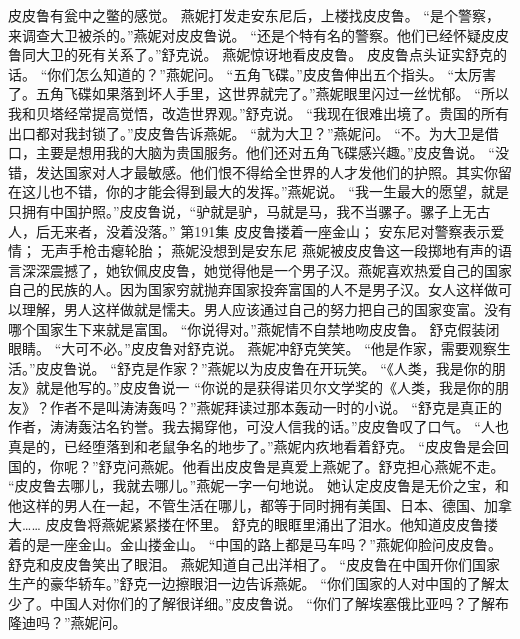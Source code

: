 \documentclass[a4paper,12pt,UTF8,twoside]{ctexbook}
\begin{document}
        皮皮鲁有瓮中之鳖的感觉。 
        燕妮打发走安东尼后，上楼找皮皮鲁。 
        “是个警察，来调查大卫被杀的。”燕妮对皮皮鲁说。 
        “还是个特有名的警察。他们已经怀疑皮皮鲁同大卫的死有关系了。”舒克说。 
        燕妮惊讶地看皮皮鲁。 
        皮皮鲁点头证实舒克的话。 
        “你们怎么知道的？”燕妮问。 
        “五角飞碟。”皮皮鲁伸出五个指头。 
        “太厉害了。五角飞碟如果落到坏人手里，这世界就完了。”燕妮眼里闪过一丝忧郁。 
        “所以我和贝塔经常提高觉悟，改造世界观。”舒克说。 
        “我现在很难出境了。贵国的所有出口都对我封锁了。”皮皮鲁告诉燕妮。 
        “就为大卫？”燕妮问。 
        “不。为大卫是借口，主要是想用我的大脑为贵国服务。他们还对五角飞碟感兴趣。”皮皮鲁说。 
        “没错，发达国家对人才最敏感。他们恨不得给全世界的人才发他们的护照。其实你留在这儿也不错，你的才能会得到最大的发挥。”燕妮说。 
        “我一生最大的愿望，就是只拥有中国护照。”皮皮鲁说，“驴就是驴，马就是马，我不当骡子。骡子上无古人，后无来者，没着没落。”   第191集 
        皮皮鲁搂着一座金山； 
        安东尼对警察表示爱情； 
        无声手枪击瘪轮胎； 
        燕妮没想到是安东尼   
        燕妮被皮皮鲁这一段掷地有声的语言深深震撼了，她钦佩皮皮鲁，她觉得他是一个男子汉。燕妮喜欢热爱自己的国家自己的民族的人。因为国家穷就抛弃国家投奔富国的人不是男子汉。女人这样做可以理解，男人这样做就是懦夫。男人应该通过自己的努力把自己的国家变富。没有哪个国家生下来就是富国。 
        “你说得对。”燕妮情不自禁地吻皮皮鲁。 
        舒克假装闭眼睛。 
        “大可不必。”皮皮鲁对舒克说。 
        燕妮冲舒克笑笑。 
        “他是作家，需要观察生活。”皮皮鲁说。 
        “舒克是作家？”燕妮以为皮皮鲁在开玩笑。 
        “《人类，我是你的朋友》就是他写的。”皮皮鲁说一 
        “你说的是获得诺贝尔文学奖的《人类，我是你的朋友》？作者不是叫涛涛轰吗？”燕妮拜读过那本轰动一时的小说。 
        “舒克是真正的作者，涛涛轰沽名钓誉。我去揭穿他，可没人信我的话。”皮皮鲁叹了口气。 
        “人也真是的，已经堕落到和老鼠争名的地步了。”燕妮内疚地看着舒克。 
        “皮皮鲁是会回国的，你呢？”舒克问燕妮。他看出皮皮鲁是真爱上燕妮了。舒克担心燕妮不走。 
        “皮皮鲁去哪儿，我就去哪儿。”燕妮一字一句地说。 
        她认定皮皮鲁是无价之宝，和他这样的男人在一起，不管生活在哪儿，都等于同时拥有美国、日本、德国、加拿大…… 
        皮皮鲁将燕妮紧紧搂在怀里。 
        舒克的眼眶里涌出了泪水。他知道皮皮鲁搂着的是一座金山。金山搂金山。 
        “中国的路上都是马车吗？”燕妮仰脸问皮皮鲁。 
        舒克和皮皮鲁笑出了眼泪。 
        燕妮知道自己出洋相了。 
        “皮皮鲁在中国开你们国家生产的豪华轿车。”舒克一边擦眼泪一边告诉燕妮。 
        “你们国家的人对中国的了解太少了。中国人对你们的了解很详细。”皮皮鲁说。 
        “你们了解埃塞俄比亚吗？了解布隆迪吗？”燕妮问。 
\end{document}
